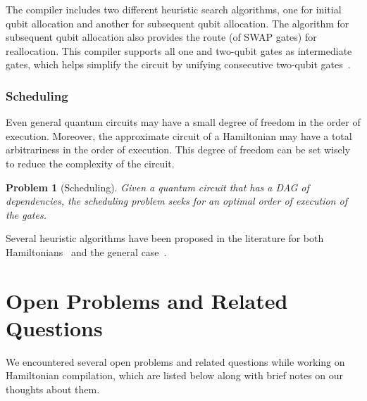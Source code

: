 \documentclass{report}
\newtheorem{problem}{Problem}
\begin{document}
The compiler includes two different heuristic search algorithms, one for initial qubit allocation and another for subsequent qubit allocation. The algorithm for subsequent qubit allocation also provides the route (of SWAP gates) for reallocation. This compiler supports all one and two-qubit gates as intermediate gates, which helps simplify the circuit by unifying consecutive two-qubit gates~\cite{lao2021}.


\subsection{Scheduling}

Even general quantum circuits may have a small degree of freedom in the order of execution. Moreover, the approximate circuit of a Hamiltonian may have a total arbitrariness in the order of execution. This degree of freedom can be set wisely to reduce the complexity of the circuit.

\begin{problem}[Scheduling]
  Given a quantum circuit that has a DAG of dependencies, the scheduling problem seeks for an optimal order of execution of the gates.
\end{problem}

Several heuristic algorithms have been proposed in the literature for both Hamiltonians~\cite{lao2021} and the general case~\cite{zhou2020, zulehner2018}.

\chapter{Open Problems and Related Questions}\label{chap:open_problems}

We encountered several open problems and related questions while working on Hamiltonian compilation, which are listed below along with brief notes on our thoughts about them.
\end{document}
